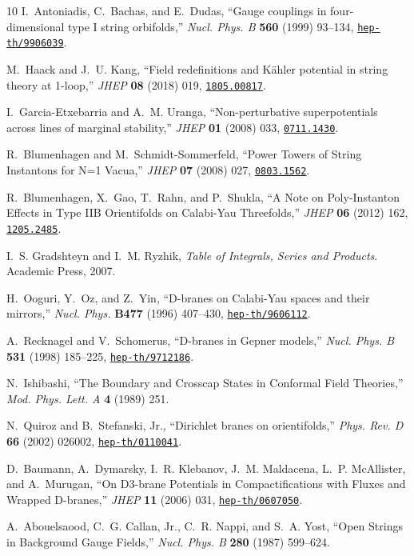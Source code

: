 \documentclass[12pt,a4paper]{article}
\begin{document}
\begin{thebibliography}{10}
	I.~Antoniadis, C.~Bachas, and E.~Dudas, ``{Gauge couplings in four-dimensional
		type I string orbifolds},'' {\em Nucl. Phys. B} {\bf 560} (1999) 93--134,
	\href{http://www.arXiv.org/abs/hep-th/9906039}{{\tt hep-th/9906039}}.
	
	M.~Haack and J.~U. Kang, ``{Field redefinitions and K\"ahler potential in
		string theory at 1-loop},'' {\em JHEP} {\bf 08} (2018) 019,
	\href{http://www.arXiv.org/abs/1805.00817}{{\tt 1805.00817}}.
	
	I.~Garcia-Etxebarria and A.~M. Uranga, ``{Non-perturbative superpotentials
		across lines of marginal stability},'' {\em JHEP} {\bf 01} (2008) 033,
	\href{http://www.arXiv.org/abs/0711.1430}{{\tt 0711.1430}}.
	
	R.~Blumenhagen and M.~Schmidt-Sommerfeld, ``{Power Towers of String Instantons
		for N=1 Vacua},'' {\em JHEP} {\bf 07} (2008) 027,
	\href{http://www.arXiv.org/abs/0803.1562}{{\tt 0803.1562}}.
	
	R.~Blumenhagen, X.~Gao, T.~Rahn, and P.~Shukla, ``{A Note on Poly-Instanton
		Effects in Type IIB Orientifolds on Calabi-Yau Threefolds},'' {\em JHEP} {\bf
		06} (2012) 162, \href{http://www.arXiv.org/abs/1205.2485}{{\tt 1205.2485}}.
	
	I.~S. Gradshteyn and I.~M. Ryzhik, {\em Table of Integrals, Series and
		Products}.
	\newblock Academic Press, 2007.
	
	H.~Ooguri, Y.~Oz, and Z.~Yin, ``{D-branes on Calabi-Yau spaces and their
		mirrors},'' {\em Nucl. Phys.} {\bf B477} (1996) 407--430,
	\href{http://www.arXiv.org/abs/hep-th/9606112}{{\tt hep-th/9606112}}.
	
	A.~Recknagel and V.~Schomerus, ``{D-branes in Gepner models},'' {\em Nucl.
		Phys. B} {\bf 531} (1998) 185--225,
	\href{http://www.arXiv.org/abs/hep-th/9712186}{{\tt hep-th/9712186}}.
	
	N.~Ishibashi, ``{The Boundary and Crosscap States in Conformal Field
		Theories},'' {\em Mod. Phys. Lett. A} {\bf 4} (1989) 251.
	
	N.~Quiroz and B.~Stefanski, Jr., ``{Dirichlet branes on orientifolds},'' {\em
		Phys. Rev. D} {\bf 66} (2002) 026002,
	\href{http://www.arXiv.org/abs/hep-th/0110041}{{\tt hep-th/0110041}}.
	
	D.~Baumann, A.~Dymarsky, I.~R. Klebanov, J.~M. Maldacena, L.~P. McAllister, and
	A.~Murugan, ``{On D3-brane Potentials in Compactifications with Fluxes and
		Wrapped D-branes},'' {\em JHEP} {\bf 11} (2006) 031,
	\href{http://www.arXiv.org/abs/hep-th/0607050}{{\tt hep-th/0607050}}.
	
	A.~Abouelsaood, C.~G. Callan, Jr., C.~R. Nappi, and S.~A. Yost, ``{Open Strings
		in Background Gauge Fields},'' {\em Nucl. Phys. B} {\bf 280} (1987) 599--624.
	
\end{thebibliography}\endgroup
\end{document}
